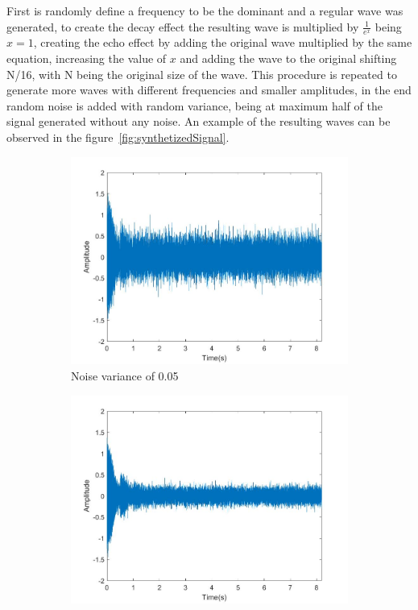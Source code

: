 First is randomly define a frequency to be the dominant and a regular wave was generated, to create the decay effect the resulting wave is multiplied by $\frac{1}{e^{x}}$ being $x=1$, creating the echo effect by adding the original wave multiplied by the same equation, increasing the value of $x$ and adding the wave to the original shifting N/16, with N being the original size of the wave. This procedure is repeated to generate more waves with different frequencies and smaller amplitudes, in the end random noise is added with random variance, being at maximum half of the signal generated without any noise. An example of the resulting waves can be observed in the figure~\ref{fig:synthetizedSignal}.
\begin{figure}[]
    \centering
    \begin{subfigure}{0.45\textwidth}
        \centering
        \includegraphics[width=\linewidth]{Chapters/6CHP/Figures/signal1.jpg}
        \caption{Noise variance of 0.05}{}
    \end{subfigure}
    \begin{subfigure}{0.45\textwidth}
        \centering
        \includegraphics[width=\linewidth]{Chapters/6CHP/Figures/signal2.jpg}

\end{subfigure}
\end{figure}
